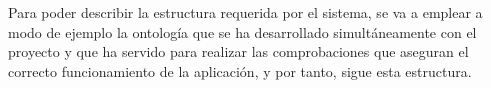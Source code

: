 Para poder describir la estructura requerida por el sistema, se va a emplear a modo de ejemplo la ontología 
que se ha desarrollado simultáneamente con el proyecto y que ha servido para realizar las comprobaciones que aseguran
el correcto funcionamiento de la aplicación, y por tanto, sigue esta estructura. \medskip




